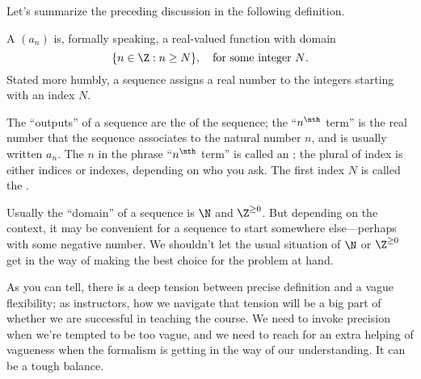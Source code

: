 Let's summarize the preceding discussion in the following definition.
\begin{definition} \relax{} A 
  $(a_n)$ is, formally speaking, a real-valued function with domain
  \[
  \{ n \in \Z : n \geq N \},\quad \mbox{for some integer $N$.}
  \]
  Stated more humbly, a sequence assigns a real number to the
  integers starting with an index $N$.

  The ``outputs'' of a sequence are the  of the
  sequence; the ``$n^{\nth}$ term'' is the real number that the
  sequence associates to the natural number $n$, and is usually
  written $a_n$.  The $n$ in the phrase
  ``$n^{\nth}$ term'' is called an
  ; the plural of index is
  either indices or indexes, depending on who you ask.  The first
  index $N$ is called the .
\end{definition} 



\begin{warning}
  Usually the ``domain'' of a sequence is $\N$ and $\Z^{\ge 0}$.  But
  depending on the context, it may be convenient for a sequence to
  start somewhere else---perhaps with some negative number.  We
  shouldn't let the usual situation of $\N$ or $\Z^{\ge 0}$ get in the
  way of making the best choice for the problem at hand.
\end{warning}

As you can tell, there is a deep tension between precise definition
and a vague flexibility; as instructors, how we navigate that tension
will be a big part of whether we are successful in teaching the
course.  We need to invoke precision when we're tempted to be too
vague, and we need to reach for an extra helping of vagueness when the
formalism is getting in the way of our understanding.  It can be a
tough balance.

